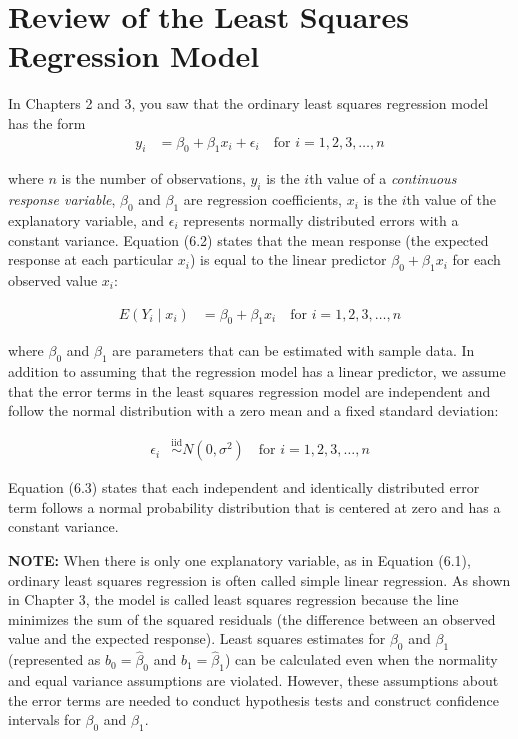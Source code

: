 \documentclass[
]{report}
\begin{document}
\hypertarget{review-of-the-least-squares-regression-model}{%
\section{\texorpdfstring{\textbf{Review of the Least Squares Regression Model}}{Review of the Least Squares Regression Model}}\label{review-of-the-least-squares-regression-model}}

In Chapters 2 and 3, you saw that the ordinary least squares regression model has the form
\begin{align}
y_i &= \beta_0 + \beta_1 x_i + \epsilon_i
\quad\text{for } i = 1, 2, 3, \dots, n
\tag{6.1}
\end{align}

where \(n\) is the number of observations, \(y_i\) is the \(i\)th value of a \textit{continuous response variable}, \(\beta_0\) and \(\beta_1\) are regression coefficients, \(x_i\) is the \(i\)th value of the explanatory variable, and \(\epsilon_i\) represents normally distributed errors with a constant variance. Equation (6.2) states that the mean response (the expected response at each particular \(x_i\)) is equal to the linear predictor \(\beta_0 + \beta_1 x_i\) for each observed value \(x_i\):

\begin{align}
E(Y_i \mid x_i) &= \beta_0 + \beta_1 x_i 
\quad\text{for } i = 1, 2, 3, \dots, n
\tag{6.2}
\end{align}

where \(\beta_0\) and \(\beta_1\) are parameters that can be estimated with sample data. In addition to assuming that the regression model has a linear predictor, we assume that the error terms in the least squares regression model are independent and follow the normal distribution with a zero mean and a fixed standard deviation:

\begin{align}
\epsilon_i &\overset{\mathrm{iid}}{\sim} N(0, \sigma^2) 
\quad\text{for } i = 1, 2, 3, \dots, n
\tag{6.3}
\end{align}

Equation (6.3) states that each independent and identically distributed error term follows a normal probability
distribution that is centered at zero and has a constant variance.

\large

\textbf{NOTE:}
When there is only one explanatory variable, as in Equation (6.1), ordinary least squares regression is often called simple linear regression. As shown in Chapter 3, the model is called least squares regression because the line minimizes the sum of the squared residuals (the difference between an observed value and the expected response). Least squares estimates for \(\beta_0\) and \(\beta_1\) (represented as \(b_0 = \hat\beta_0\) and \(b_1 = \hat\beta_1\)) can be calculated even when the normality and equal variance assumptions are violated. However, these assumptions about the error terms are needed to conduct hypothesis tests and construct confidence intervals for \(\beta_0\) and \(\beta_1\).
\normalsize
\end{document}
